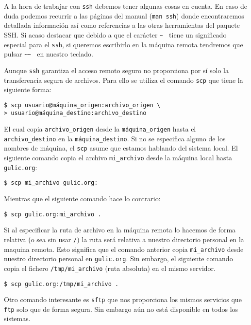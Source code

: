 A la  hora de trabajar  con {\tt ssh}  debemos tener algunas  cosas en
cuenta. En  caso de  duda podemos  recurrir a  las páginas  del manual
({\tt  man ssh})  donde encontraremos  detallada información  así como
referencias  a  las  otras  herramientas del  paquete  SSH.  Si  acaso
destacar que debido a que el carácter {\tt \~{} } tiene un significado
especial  para el  {\tt ssh},  si  queremos escribirlo  en la  máquina
remota tendremos que pulsar {\tt \~{}\~{} } en nuestro teclado.

Aunque {\tt ssh} garantiza el  acceso remoto seguro no proporciona por
sí solo la  transferencia segura de archivos. Para ello  se utiliza el
comando {\tt scp} que tiene la siguiente forma:

\begin{verbatim}
$ scp usuario@máquina_origen:archivo_origen \
> usuario@máquina_destino:archivo_destino
\end{verbatim}

El  cual copia  {\tt archivo\_origen}  desde la  {\tt máquina\_origen}
hasta el {\tt archivo\_destino} en la {\tt máquina\_destino}. Si no se
especifica alguno  de los nombres de  máquina, el {\tt scp}  asume que
estamos  hablando  del  sistema  local.  El  siguiente  comando  copia
el  archivo  {\tt  mi\_archivo}  desde la  máquina  local  hasta  {\tt
gulic.org}:

\begin{verbatim}
$ scp mi_archivo gulic.org:
\end{verbatim}

Mientras que el siguiente comando hace lo contrario:
      
\begin{verbatim}
$ scp gulic.org:mi_archivo .
\end{verbatim}

Si al especificar  la ruta de archivo en la  máquina remota lo hacemos
de forma  relativa (o sea  sin usar {\tt /})  la ruta será  relativa a
nuestro directorio personal  en la maquina remota.  Esto significa que
el comando  anterior copia {\tt mi\_archivo}  desde nuestro directorio
personal en {\tt gulic.org}. Sin embargo, el siguiente comando
copia el  fichero {\tt /tmp/mi\_archivo}  (ruta absoluta) en  el mismo
servidor.

\begin{verbatim}
$ scp gulic.org:/tmp/mi_archivo .
\end{verbatim}

Otro comando interesante es {\tt sftp} que nos proporciona
los  mismos servicios  que {\tt  ftp} solo  que de  forma segura.  Sin
embargo aún no está disponible en todos los sistemas.

